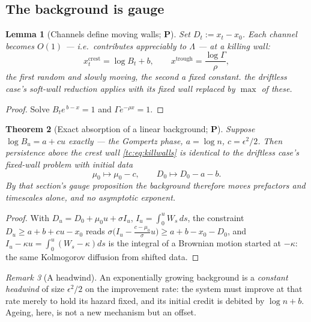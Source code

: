 \documentclass[11pt]{article}
\numberwithin{equation}{section}
\theoremstyle{plain}
\newtheorem{theorem}{Theorem}[section]
\newtheorem{lemma}[theorem]{Lemma}
\theoremstyle{definition}
\theoremstyle{remark}
\newtheorem{remark}[theorem]{Remark}
\begin{document}
\subsection{The background is gauge}\label{tc:subsub:gauge}

\begin{lemma}[Channels define moving walls; \textbf{P}]
\label{tc:lem:walls}
Set $D_t:=x_t-x_0$. Each channel becomes $O(1)$ --- i.e.\ contributes
appreciably to $\Lambda$ --- at a \emph{killing wall}:
\begin{equation}\label{tc:eq:killwalls}
x^{\mathrm{crest}}_t=\log B_t+b,
\qquad
x^{\mathrm{trough}}=\frac{\log\Gamma}{\rho},
\end{equation}
the first random and slowly moving, the second a fixed constant. the driftless case's soft-wall reduction applies with its fixed wall replaced by
$\max$ of these.
\end{lemma}

\begin{proof}
Solve $B_te^{\,b-x}=1$ and $\Gamma e^{-\rho x}=1$.
\end{proof}

\begin{theorem}[Exact absorption of a linear background; \textbf{P}]
\label{tc:thm:absorb}
Suppose $\log B_u=a+cu$ exactly --- the Gompertz phase, $a=\log n$,
$c=\epsilon^{2}/2$. Then persistence above the crest wall
\eqref{tc:eq:killwalls} is \emph{identical} to the driftless case's fixed-wall
problem with initial data
\begin{equation}\label{tc:eq:shift}
\mu_0\longmapsto\mu_0-c,\qquad D_0\longmapsto D_0-a-b .
\end{equation}
By that section's gauge proposition the background therefore moves
prefactors and timescales alone, and no asymptotic exponent.
\end{theorem}

\begin{proof}
With $D_u=D_0+\mu_0u+\sigma I_u$, $I_u=\int_0^u W_s\,ds$, the constraint
$D_u\ge a+b+cu-x_0$ reads
$\sigma\bigl(I_u-\tfrac{c-\mu_0}{\sigma}u\bigr)\ge a+b-x_0-D_0$, and
$I_u-\kappa u=\int_0^u(W_s-\kappa)ds$ is the integral of a Brownian
motion started at $-\kappa$: the same Kolmogorov diffusion from shifted
data.
\end{proof}

\begin{remark}[A headwind]\label{tc:rem:headwind}
An exponentially growing background is a \emph{constant headwind} of
size $\epsilon^{2}/2$ on the improvement rate: the system must improve
at that rate merely to hold its hazard fixed, and its initial credit is
debited by $\log n+b$. Ageing, here, is not a new mechanism but an
offset.
\end{remark}
\end{document}
